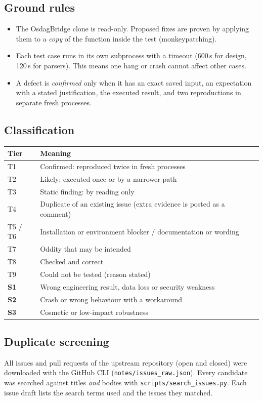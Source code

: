 \documentclass[11pt,a4paper]{article}
\newcommand{\sevH}{\textcolor{sevhigh}{\textbf{S1}}}
\newcommand{\sevM}{\textcolor{sevmed}{\textbf{S2}}}
\newcommand{\sevL}{\textcolor{sevlow}{\textbf{S3}}}
\begin{document}
\subsection{Ground rules}
\begin{itemize}[nosep]
  \item The OsdagBridge clone is read-only. Proposed fixes are proven by applying them to a \emph{copy} of the function inside the test (monkeypatching).
  \item Each test case runs in its own subprocess with a timeout (600\,s for design, 120\,s for parsers). This means one hang or crash cannot affect other cases.
  \item A defect is \emph{confirmed} only when it has an exact saved input, an expectation with a stated justification, the executed result, and two reproductions in separate fresh processes.
\end{itemize}

\subsection{Classification}
\begin{tabular}{@{}lL{12.5cm}@{}}
\toprule
Tier & Meaning \\
\midrule
T1 & Confirmed: reproduced twice in fresh processes \\
T2 & Likely: executed once or by a narrower path \\
T3 & Static finding: by reading only \\
T4 & Duplicate of an existing issue (extra evidence is posted as a comment) \\
T5 / T6 & Installation or environment blocker / documentation or wording \\
T7 & Oddity that may be intended \\
T8 & Checked and correct \\
T9 & Could not be tested (reason stated) \\
\midrule
\sevH & Wrong engineering result, data loss or security weakness \\
\sevM & Crash or wrong behaviour with a workaround \\
\sevL & Cosmetic or low-impact robustness \\
\bottomrule
\end{tabular}

\subsection{Duplicate screening}
All issues and pull requests of the upstream repository (open and closed) were downloaded with the GitHub CLI (\texttt{notes/issues\_raw.json}). Every candidate was searched against titles \emph{and} bodies with \texttt{scripts/search\_issues.py}. Each issue draft lists the search terms used and the issues they matched.
\end{document}
